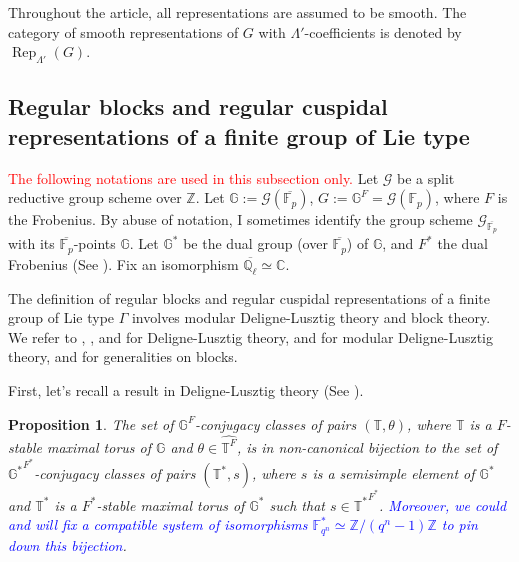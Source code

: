 \documentclass{article}
\newcommand{\red}[1]{\textcolor{red}{#1}}
\newcommand{\blue}[1]{\textcolor{blue}{#1}}
\newtheorem{proposition}{Proposition}
\newcommand{\Rep}{\operatorname{Rep}}
\begin{document}
	Throughout the article, all representations are assumed to be smooth. The category of smooth representations of $G$ with $\Lambda'$-coefficients is denoted by $\Rep_{\Lambda'}(G)$.
	
	\subsection{Regular blocks and regular cuspidal representations of a finite group of Lie type}
	
	\red{The following notations are used in this subsection only.} Let $\mathcal{G}$ be a split reductive group scheme over $\mathbb{Z}$. Let $\mathbb{G}:=\mathcal{G}(\overline{\mathbb{F}_p})$, $G:=\mathbb{G}^F=\mathcal{G}(\mathbb{F}_p)$, where $F$ is the Frobenius. By abuse of notation, I sometimes identify the group scheme $\mathcal{G}_{\overline{\mathbb{F}_p}}$ with its $\overline{\mathbb{F}_p}$-points $\mathbb{G}$. Let $\mathbb{G}^*$ be the dual group (over $\overline{\mathbb{F}_p}$) of $\mathbb{G}$, and $F^*$ the dual Frobenius (See \cite[Section 4.2]{carter1985finite}). Fix an isomorphism $\overline{\mathbb{Q}_{\ell}} \simeq \mathbb{C}$. 
	
	The definition of regular blocks and regular cuspidal representations of a finite group of Lie type $\Gamma$ involves modular Deligne-Lusztig theory and block theory. We refer to \cite{deligne1976representations}, \cite{carter1985finite}, and \cite{digne2020representations} for Deligne-Lusztig theory, \cite{michel1989bloc} and \cite{broue1990isometries} for modular Deligne-Lusztig theory, and \cite[Appendix B]{bonnafe2010representations} for generalities on blocks. 
	
	First, let's recall a result in Deligne-Lusztig theory (See \cite[Proposition 11.1.5]{digne2020representations}). 
	
	\begin{proposition}\label{Prop dual torus}
		The set of $\mathbb{G}^F$-conjugacy classes of pairs $(\mathbb{T}, \theta)$, where  $\mathbb{T}$ is a $F$-stable maximal torus of  $\mathbb{G}$ and $\theta \in \widehat{\mathbb{T}^F}$, is in non-canonical bijection to the set of $\mathbb{G^*}^{F^*}$-conjugacy classes of pairs $(\mathbb{T}^*, s)$, where $s$ is a semisimple element of $\mathbb{G}^*$ and $\mathbb{T}^*$ is a $F^*$-stable maximal torus of $\mathbb{G}^*$ such that $s \in {\mathbb{T}^*}^{F^*}$.  \blue{Moreover, we could and will fix a compatible system of isomorphisms $\mathbb{F}_{q^n}^* \simeq \mathbb{Z}/(q^n-1)\mathbb{Z}$ to pin down this bijection}.
	\end{proposition}
	
\end{document}
